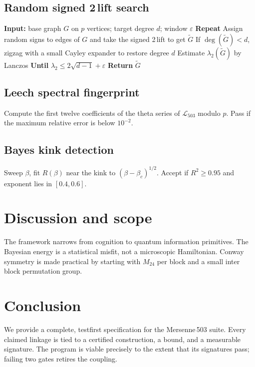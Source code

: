 \documentclass[11pt]{article}
\theoremstyle{definition}
\newcommand{\Lproj}{\mathcal L_{503}}
\begin{document}
\subsection{Random signed 2\,lift search}\label{sec:algorithm-lift}
\begin{algorithm}[H]
\caption{LiftSearch$(G,d,\varepsilon)$}
\begin{algorithmic}[1]
\State \textbf{Input:} base graph $G$ on $p$ vertices; target degree $d$; window $\varepsilon$
\State \textbf{Repeat}
\State \quad Assign random signs to edges of $G$ and take the signed 2\,lift to get $\tilde G$
\State \quad If $\deg(\tilde G)<d$, zig\textendash zag with a small Cayley expander to restore degree $d$
\State \quad Estimate $\lambda_2(\tilde G)$ by Lanczos
\State \textbf{Until} $\lambda_2\le 2\sqrt{d-1}+\varepsilon$
\State \textbf{Return} $\tilde G$
\end{algorithmic}
\end{algorithm}

\subsection{Leech spectral fingerprint}
Compute the first twelve coefficients of the theta series of \(\Lproj\) modulo \(p\). Pass if the maximum relative error is below \(10^{-2}\).

\subsection{Bayes kink detection}
Sweep \(\beta\), fit \(R(\beta)\) near the kink to \((\beta-\beta_c)^{1/2}\). Accept if $R^2\ge 0.95$ and exponent lies in $[0.4,0.6]$.

\section{Discussion and scope}
The framework narrows from cognition to quantum information primitives. The Bayesian energy is a statistical misfit, not a microscopic Hamiltonian. Conway symmetry is made practical by starting with $M_{24}$ per block and a small inter\,block permutation group.

\section{Conclusion}
We provide a complete, test\textendash first specification for the Mersenne\,503 suite. Every claimed linkage is tied to a certified construction, a bound, and a measurable signature. The program is viable precisely to the extent that its signatures pass; failing two gates retires the coupling.
\end{document}
